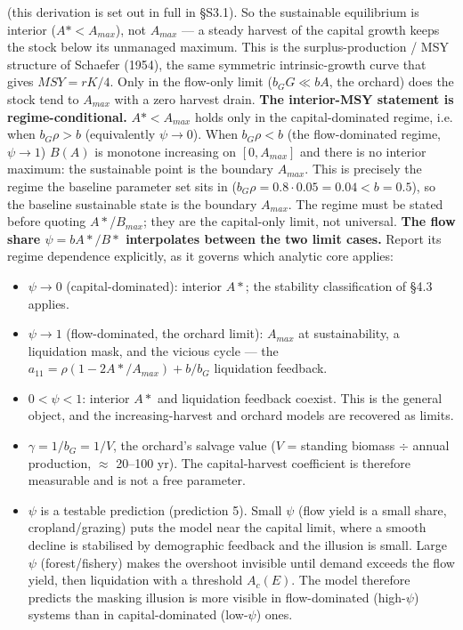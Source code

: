 \documentclass[11pt]{article}
\begin{document}
(this derivation is set out in full in §S3.1). So the sustainable equilibrium is interior ($A* < A_{max}$), not $A_{max}$ — a steady harvest of the capital growth keeps the stock below its unmanaged maximum. This is the surplus-production / MSY structure of Schaefer (1954), the same symmetric intrinsic-growth curve that gives $MSY = rK/4$. Only in the flow-only limit ($b_{G} G \ll{} bA$, the orchard) does the stock tend to $A_{max}$ with a zero harvest drain. \textbf{The interior-MSY statement is regime-conditional.} $A* < A_{max}$ holds only in the capital-dominated regime, i.e. when $b_{G} \rho{} > b$ (equivalently $\psi{} \to{} 0$). When $b_{G} \rho{} < b$ (the flow-dominated regime, $\psi{} \to{} 1$) $B(A)$ is monotone increasing on $[0, A_{max}]$ and there is no interior maximum: the sustainable point is the boundary $A_{max}$. This is precisely the regime the baseline parameter set sits in ($b_{G} \rho{} = 0.8\cdot{}0.05 = 0.04 < b = 0.5$), so the baseline sustainable state is the boundary $A_{max}$. The regime must be stated before quoting $A*$/$B_{max}$; they are the capital-only limit, not universal. \textbf{The flow share $\psi{} = bA*/B*$ interpolates between the two limit cases.} Report its regime dependence explicitly, as it governs which analytic core applies:

\begin{itemize}
\item $\psi{} \to{} 0$ (capital-dominated): interior $A*$; the stability classification of §4.3 applies.
\item $\psi{} \to{} 1$ (flow-dominated, the orchard limit): $A_{max}$ at sustainability, a liquidation mask, and the vicious cycle — the $a_{11} = \rho{}(1-2A*/A_{max}) + b/b_{G}$ liquidation feedback.
\item $0 < \psi{} < 1$: interior $A*$ and liquidation feedback coexist. This is the general object, and the increasing-harvest and orchard models are recovered as limits.
\item $\gamma{} = 1/b_{G} = 1/V$, the orchard's salvage value ($V$ = standing biomass \ensuremath{\div{}} annual production, \ensuremath{\approx{}} 20–100 yr). The capital-harvest coefficient is therefore measurable and is not a free parameter.
\item $\psi{}$ is a testable prediction (prediction 5). Small $\psi{}$ (flow yield is a small share, cropland/grazing) puts the model near the capital limit, where a smooth decline is stabilised by demographic feedback and the illusion is small. Large $\psi{}$ (forest/fishery) makes the overshoot invisible until demand exceeds the flow yield, then liquidation with a threshold $A_{c}(E)$. The model therefore predicts the masking illusion is more visible in flow-dominated (high-$\psi{}$) systems than in capital-dominated (low-$\psi{}$) ones.
\end{itemize}
\end{document}

